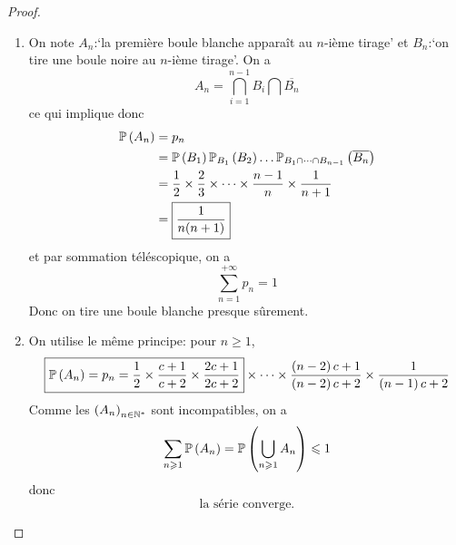 \documentclass[12pt]{article}
\begin{document}
\begin{proof}
    \phantom{}
    \begin{enumerate}
        \item On note $A_{n}$:`la première boule blanche apparaît au $n$-ième tirage' et $B_{n}$:`on tire une boule noire au $n$-ième tirage'. On a 
        \begin{equation}
            A_{n}=\bigcap_{i=1}^{n-1}B_{i}\bigcap\overline{B_{n}}
        \end{equation}
        ce qui implique donc 
        \begin{align}
            \P\left(A_{n}\right)
            &=p_{n}\\
            &=\P\left(B_{1}\right)\P_{B_{1}}\left(B_{2}\right)\dots\P_{B_{1}\cap \dots \cap B_{n-1}}\left(\overline{B_{n}}\right)\\
            &=\frac{1}{2}\times\frac{2}{3}\times\dots\times\frac{n-1}{n}\times\frac{1}{n+1}\\
            &=\boxed{\frac{1}{n(n+1)}}
        \end{align}
        et par sommation téléscopique, on a 
        \begin{equation}
            \boxed{\sum_{n=1}^{+\infty}p_{n}=1}
        \end{equation}
        Donc on tire une boule blanche presque sûrement.

        \item On utilise le même principe: pour $n\geqslant1$,
        \begin{equation}
            \boxed{\P\left(A_{n}\right)=p_{n}=\frac{1}{2}\times\frac{c+1}{c+2}\times\frac{2c+1}{2c+2}}\times\dots\times\frac{\left(n-2\right)c+1}{\left(n-2\right)c+2}\times\frac{1}{\left(n-1\right)c+2}
        \end{equation}
        Comme les $\left(A_{n}\right)_{n\in\N^{*}}$ sont incompatibles, on a 
        \begin{equation}
            \sum_{n\geqslant1}\P\left(A_{n}\right)=\P\left(\bigcup_{n\geqslant1} A_{n}\right)\leqslant1
        \end{equation}
        donc 
        \begin{equation}
            \boxed{\text{la série converge.}}
        \end{equation}


\end{enumerate}
\end{proof}
\end{document}
